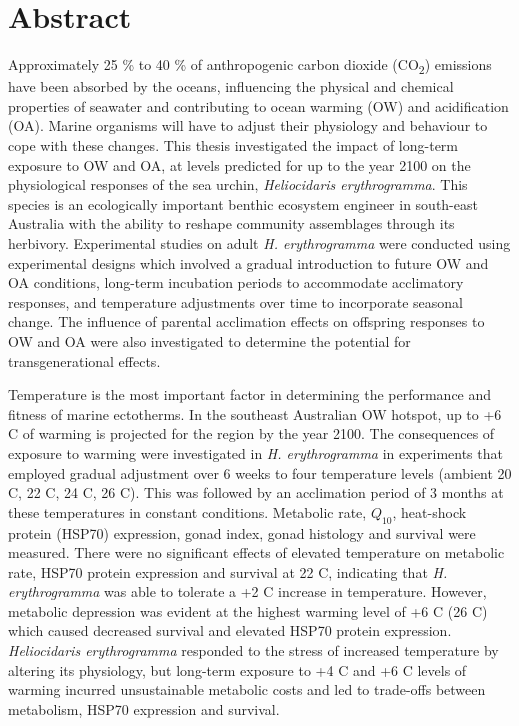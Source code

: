 \SingleSpacing

\chapter{Abstract}

\OnehalfSpacing

Approximately 25 \% to 40 \% of anthropogenic carbon dioxide (CO\textsubscript{2}) emissions have been absorbed by the oceans, influencing the physical and chemical properties of seawater and contributing to ocean warming (OW) and acidification (OA).
Marine organisms will have to adjust their physiology and behaviour to cope with these changes.
This thesis investigated the impact of long-term exposure to OW and OA, at levels predicted for up to the year 2100 on the physiological responses of the sea urchin, \textit{Heliocidaris erythrogramma}. 
This species is an ecologically important benthic ecosystem engineer in south-east Australia with the ability to reshape community assemblages through its herbivory.
Experimental studies on adult \textit{H. erythrogramma} were conducted using experimental designs which involved a gradual introduction to future OW and OA conditions,  long-term incubation periods to accommodate acclimatory responses, and temperature adjustments over time to incorporate seasonal change. The influence of parental acclimation effects on offspring responses to OW and OA were also investigated to determine the potential for transgenerational effects.

Temperature is the most important factor in determining the performance and fitness of marine ectotherms. 
In the southeast Australian OW hotspot, up to +6 \degree C of warming is projected for the region by the year 2100. 
The consequences of exposure to warming were investigated in \textit{H. erythrogramma} in experiments that employed gradual adjustment over 6 weeks to four temperature levels (ambient 20 \degree C, 22 \degree C, 24 \degree C, 26 \degree C). This was followed by an acclimation period of 3 months at these temperatures in constant conditions.
Metabolic rate, $Q_{10}$, heat-shock protein (HSP70) expression, gonad index, gonad histology and survival were measured. 
There were no significant effects of elevated temperature on metabolic rate, HSP70 protein expression and survival at 22 \degree C, indicating that \textit{H. erythrogramma} was able to tolerate a +2 \degree C increase in temperature.
However, metabolic depression was evident at the highest warming level of +6 \degree C (26 \degree C) which caused decreased survival and elevated HSP70 protein expression.
\textit{Heliocidaris erythrogramma} responded to the stress of increased temperature by altering its physiology, but long-term exposure to +4 \degree C and +6 \degree C levels of warming incurred unsustainable metabolic costs and led to trade-offs between metabolism, HSP70 expression and survival. 

